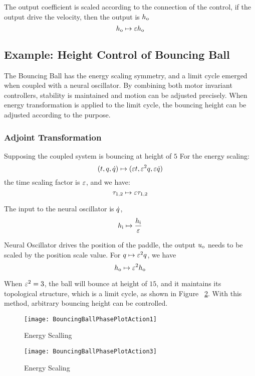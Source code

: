 The output coefficient is scaled according to the connection of the control, 
if the output drive the velocity, then the output is $h_{\mathrm{o}}$
\[
h_{\mathrm{o}} \mapsto \varepsilon h_{\mathrm{o}}
\]




\subsection{Example: Height Control of Bouncing Ball}

The Bouncing Ball has the energy scaling symmetry, and a limit cycle emerged when coupled with a neural oscillator.
By combining both motor invariant controllers, stability is maintained and motion can be adjusted precisely. 
When energy transformation is applied to the limit cycle, the bouncing height can be adjusted according to the purpose.

\subsubsection*{Adjoint Transformation}
Supposing the coupled system is bouncing at height of $5$
For the energy scaling:
\[
(t,q,\dot{q} ) \mapsto ( \varepsilon t ,\varepsilon^2 q,\varepsilon \dot{q})
\]
the time scaling factor is $\varepsilon$, and we have:
\[
\tau_{1,2} \mapsto \varepsilon \tau_{1,2}
\]

The input to the neural oscillator is $\dot{q}$,
\[
h_{\mathrm{i}} \mapsto \frac{h_{\mathrm{i}}}{\varepsilon}
\]
 
Neural Oscillator drives the position of the paddle, the output $u_{\mathrm{o}}$ needs to be scaled by the position scale value.
For $q \mapsto \varepsilon^2q$, we have
\[
 h_{\mathrm{o}} \mapsto \varepsilon^2 h_{\mathrm{o}}
\]

When $\varepsilon^2=3$,  the ball will bounce at height of $15$, and it maintains its topological structure, which is a limit cycle, as shown in Figure ~\ref{fig:energy3}. 
With this method, arbitrary bouncing height can be controlled.


\begin{figure}[!htbp]
  \begin{center}
   	\texttt{[image: BouncingBallPhasePlotAction1]}
    \caption{Energy Scalling}
    \label{fig:energy1}
  \end{center}
\end{figure} 


\begin{figure}[!htbp]
  \begin{center}
	\texttt{[image: BouncingBallPhasePlotAction3]}
    \caption{Energy Scaling}
    \label{fig:energy3}
  \end{center}
\end{figure}

